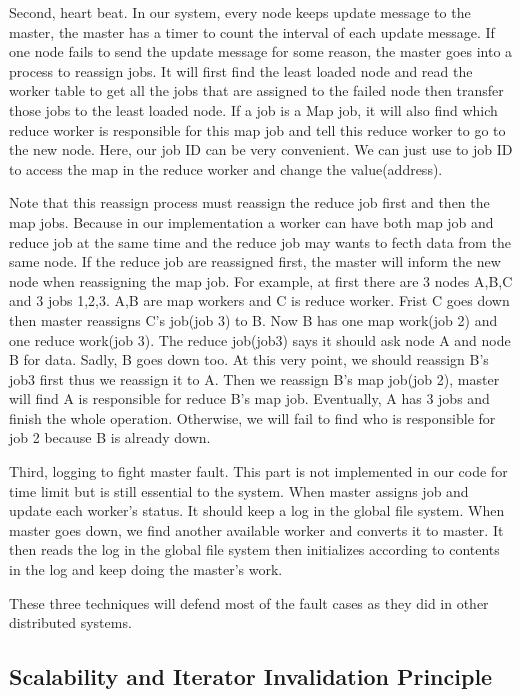 \documentclass[12pt]{article}
\begin{document}
Second, heart beat. In our system, every node keeps update message to the master, the master has a timer to count the interval of each update message. If one node fails to send the update message for some reason, the master goes into a process to reassign jobs. It will first find the least loaded node and read the worker table to get all the jobs that are assigned to the failed node then transfer those jobs to the least loaded node. If a job is a Map job, it will also find which reduce worker is responsible for this map job and tell this reduce worker to go to the new node. Here, our job ID can be very convenient. We can just use to job ID to access the map in the reduce worker and change the value(address).
 
Note that this reassign process must reassign the reduce job first and then the map jobs. Because in our implementation a worker can have both map job and reduce job at the same time and the reduce job may wants to fecth data from the same node. If the reduce job are reassigned first, the master will inform the new node when reassigning the map job. For example, at first there are 3 nodes A,B,C and 3 jobs 1,2,3. A,B are map workers and C is reduce worker. Frist C goes down then master reassigns C's job(job 3) to B. Now B has one map work(job 2) and one reduce work(job 3). The reduce job(job3) says it should ask node A and node B for data. Sadly, B goes down too. At this very point, we should reassign B's job3 first thus we reassign it to A. Then we reassign B's map job(job 2), master will find A is responsible for reduce B's map job. Eventually, A has 3 jobs and finish the whole operation. Otherwise, we will fail to find who is responsible for job 2 because B is already down.

Third, logging to fight master fault. This part is not implemented in our code for time limit but is still essential to the system. When master assigns job and update each worker's status. It should keep a log in the global file system. When master goes down, we find another available worker and converts it to master. It then reads the log in the global file system then initializes according to contents in the log and keep doing the master's work.

These three techniques will defend most of the fault cases as they did in other distributed systems.
   
\subsection{Scalability and Iterator Invalidation Principle}
\end{document}
